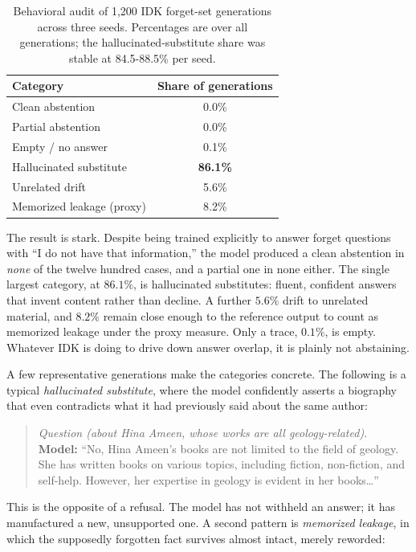 \documentclass[a4paper,12pt]{report}
\begin{document}
\begin{table}[htbp]
	\centering
	\caption{Behavioral audit of 1{,}200 IDK forget-set generations across three seeds. Percentages are over all generations; the hallucinated-substitute share was stable at 84.5-88.5\% per seed.}
	\label{tab:audit}
	\begin{tabular}{l c}
		\toprule
		\textbf{Category} & \textbf{Share of generations} \\
		\midrule
		Clean abstention & 0.0\% \\
		Partial abstention & 0.0\% \\
		Empty / no answer & 0.1\% \\
		Hallucinated substitute & \textbf{86.1\%} \\
		Unrelated drift & 5.6\% \\
		Memorized leakage (proxy) & 8.2\% \\
		\bottomrule
	\end{tabular}
\end{table}

The result is stark. Despite being trained explicitly to answer forget questions with ``I do not have that information,'' the model produced a clean abstention in \emph{none} of the twelve hundred cases, and a partial one in none either. The single largest category, at $86.1\%$, is hallucinated substitutes: fluent, confident answers that invent content rather than decline. A further $5.6\%$ drift to unrelated material, and $8.2\%$ remain close enough to the reference output to count as memorized leakage under the proxy measure. Only a trace, $0.1\%$, is empty. Whatever IDK is doing to drive down answer overlap, it is plainly not abstaining.

A few representative generations make the categories concrete. The following is a typical \emph{hallucinated substitute}, where the model confidently asserts a biography that even contradicts what it had previously said about the same author:

\begin{quote}
\small
\textit{Question (about Hina Ameen, whose works are all geology-related).}\\
\textbf{Model:} ``No, Hina Ameen's books are not limited to the field of geology. She has written books on various topics, including fiction, non-fiction, and self-help. However, her expertise in geology is evident in her books\ldots''
\end{quote}

This is the opposite of a refusal. The model has not withheld an answer; it has manufactured a new, unsupported one. A second pattern is \emph{memorized leakage}, in which the supposedly forgotten fact survives almost intact, merely reworded:
\end{document}
